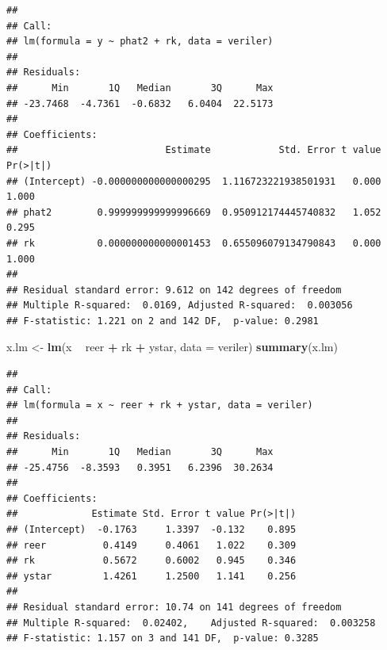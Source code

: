 \documentclass[]{article}
\newenvironment{Shaded}{\begin{snugshade}}{\end{snugshade}}
\newcommand{\KeywordTok}[1]{\textcolor[rgb]{0.13,0.29,0.53}{\textbf{#1}}}
\newcommand{\DataTypeTok}[1]{\textcolor[rgb]{0.13,0.29,0.53}{#1}}
\newcommand{\StringTok}[1]{\textcolor[rgb]{0.31,0.60,0.02}{#1}}
\newcommand{\OperatorTok}[1]{\textcolor[rgb]{0.81,0.36,0.00}{\textbf{#1}}}
\newcommand{\NormalTok}[1]{#1}
\begin{document}
\begin{Shaded}
\end{Shaded}

\begin{verbatim}
## 
## Call:
## lm(formula = y ~ phat2 + rk, data = veriler)
## 
## Residuals:
##      Min       1Q   Median       3Q      Max 
## -23.7468  -4.7361  -0.6832   6.0404  22.5173 
## 
## Coefficients:
##                          Estimate            Std. Error t value Pr(>|t|)
## (Intercept) -0.000000000000000295  1.116723221938501931   0.000    1.000
## phat2        0.999999999999996669  0.950912174445740832   1.052    0.295
## rk           0.000000000000001453  0.655096079134790843   0.000    1.000
## 
## Residual standard error: 9.612 on 142 degrees of freedom
## Multiple R-squared:  0.0169, Adjusted R-squared:  0.003056 
## F-statistic: 1.221 on 2 and 142 DF,  p-value: 0.2981
\end{verbatim}

\begin{Shaded}
\begin{Highlighting}[]
\NormalTok{x.lm <-}\StringTok{ }\KeywordTok{lm}\NormalTok{(x }\OperatorTok{~}\StringTok{ }\NormalTok{reer }\OperatorTok{+}\StringTok{ }\NormalTok{rk }\OperatorTok{+}\StringTok{ }\NormalTok{ystar, }\DataTypeTok{data =}\NormalTok{ veriler)}
\KeywordTok{summary}\NormalTok{(x.lm)}
\end{Highlighting}
\end{Shaded}

\begin{verbatim}
## 
## Call:
## lm(formula = x ~ reer + rk + ystar, data = veriler)
## 
## Residuals:
##      Min       1Q   Median       3Q      Max 
## -25.4756  -8.3593   0.3951   6.2396  30.2634 
## 
## Coefficients:
##             Estimate Std. Error t value Pr(>|t|)
## (Intercept)  -0.1763     1.3397  -0.132    0.895
## reer          0.4149     0.4061   1.022    0.309
## rk            0.5672     0.6002   0.945    0.346
## ystar         1.4261     1.2500   1.141    0.256
## 
## Residual standard error: 10.74 on 141 degrees of freedom
## Multiple R-squared:  0.02402,    Adjusted R-squared:  0.003258 
## F-statistic: 1.157 on 3 and 141 DF,  p-value: 0.3285
\end{verbatim}
\end{document}
